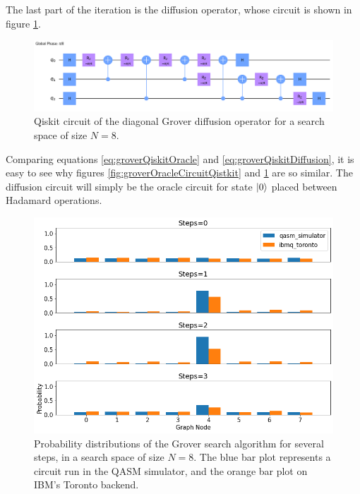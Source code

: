\documentclass[../../dissertation.tex]{subfiles}
\begin{document}
The last part of the iteration is the diffusion operator, whose circuit is
shown in figure \ref{fig:groverDiffCircuitQistkit}.
\begin{figure}[!h]
	\centering
	\includegraphics[scale=0.25]{img/Qiskit/GroverQiskit/Circuits/GroverQiskitCircDiff_N3_M4_S3.png}
	\caption{Qiskit circuit of the  diagonal Grover diffusion operator for a search space of size $N=8$.}
	\label{fig:groverDiffCircuitQistkit}
\end{figure}
Comparing equations \eqref{eq:groverQiskitOracle} and
\eqref{eq:groverQiskitDiffusion}, it is easy to see why figures
\ref{fig:groverOracleCircuitQistkit} and \ref{fig:groverDiffCircuitQistkit} are
so similar. The diffusion circuit will simply be the oracle circuit for state
$\ket{0}$ placed between Hadamard operations.
\begin{figure}[!h]
	\centering
	\includegraphics[scale=0.40]{img/Qiskit/GroverQiskit/GroverQiskitSearch_N3_M4_S0123}
	\caption{Probability distributions of the Grover search algorithm for several steps, in a search space of size $N=8$. The blue bar plot represents a circuit run in the QASM simulator, and the orange bar plot on IBM's Toronto backend.}
	\label{fig:groverQiskitDist}
\end{figure}\par
\end{document}
